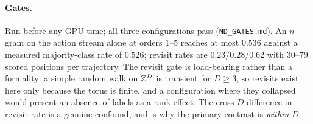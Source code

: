 \paragraph{Gates.} Run before any GPU time; all three configurations pass
(\texttt{ND\_GATES.md}). An $n$-gram on the action stream alone at orders $1$--$5$
reaches at most $0.536$ against a measured majority-class rate of $0.526$; revisit
rates are $0.23/0.28/0.62$ with $30$--$79$ scored positions per trajectory. The
revisit gate is load-bearing rather than a formality: a simple random walk on
$\mathbb{Z}^{D}$ is transient for $D\ge 3$, so revisits exist here only because the torus
is finite, and a configuration where they collapsed would present an absence of
labels as a rank effect. The cross-$D$ difference in revisit rate is a genuine
confound, and is why the primary contrast is \emph{within} $D$.
